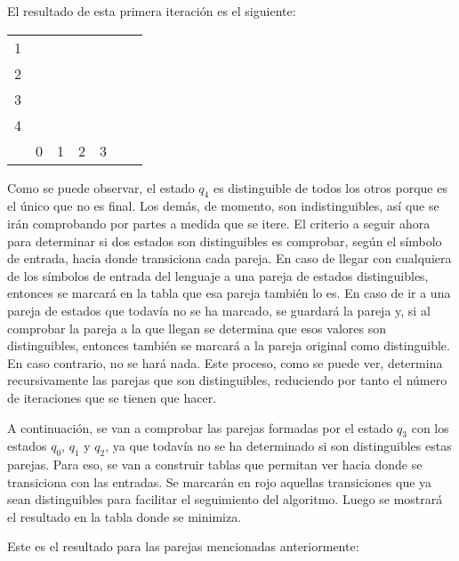 \documentclass[11pt,a4paper]{article}
\begin{document}
		El resultado de esta primera iteración es el siguiente:
		
		\begin{center}
			\begin{tabular}{*{7}{c|}}
																							\cline{2-2}
				1 & 																		\\ \cline{2-3}
				2 & &																		\\ \cline{2-4}
				3 & & &																		\\ \cline{2-5}
				4 & \color{blue}{X} & \color{blue}{X} & \color{blue}{X} & \color{blue}{X}	\\ \cline{2-5}
				\multicolumn{0}{c}{} & \multicolumn{1}{c}{0} & \multicolumn{1}{c}{1} & \multicolumn{1}{c}{2}
				& \multicolumn{1}{c}{3}
			\end{tabular}
		\end{center}
		
		Como se puede observar, el estado $q_4$ es distinguible de todos los otros porque es el único que no es final. Los
		demás, de momento, son indistinguibles, así que se irán comprobando por partes a medida que se itere. El criterio
		a seguir ahora para determinar si dos estados son distinguibles es comprobar, según el símbolo de entrada, hacia
		donde transiciona cada pareja. En caso de llegar con cualquiera de los símbolos de entrada del lenguaje a una pareja
		de estados distinguibles, entonces se marcará en la tabla que esa pareja también lo es. En caso de ir a una pareja
		de estados que todavía no se ha marcado, se guardará la pareja y, si al comprobar la pareja a la que llegan se
		determina que esos valores son distinguibles, entonces también se marcará a la pareja original como distinguible.
		En caso contrario, no se hará nada. Este proceso, como se puede ver, determina recursivamente las parejas que son
		distinguibles, reduciendo por tanto el número de iteraciones que se tienen que hacer. \par
		
		A continuación, se van a comprobar las parejas formadas por el estado $q_3$ con los estados $q_0$, $q_1$ y $q_2$, ya
		que todavía no se ha determinado si son distinguibles estas parejas. Para eso, se van a construir tablas que permitan
		ver hacia donde se transiciona con las entradas. Se marcarán en rojo aquellas transiciones que ya sean distinguibles
		para facilitar el seguimiento del algoritmo. Luego se mostrará el resultado en la tabla donde se minimiza. \par
		
		Este es el resultado para las parejas mencionadas anteriormente:
		
\end{document}
